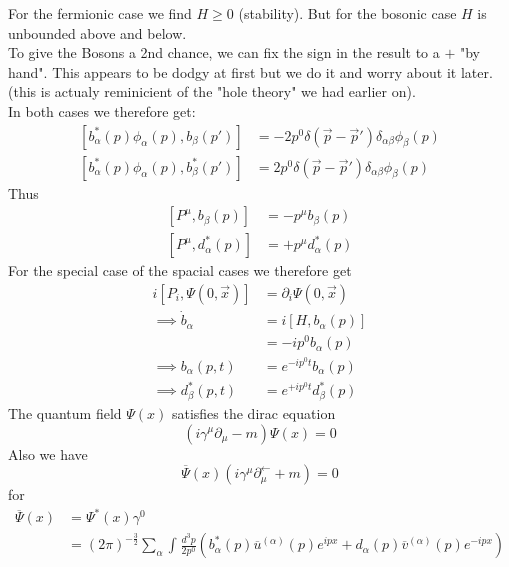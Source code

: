 \documentclass{report}
\begin{document}
For the fermionic case we find $H \ge 0$ (stability). But for the bosonic case $H$ is unbounded above and below.\\
To give the Bosons a 2nd chance, we can fix the sign in the result to a $+$ "by hand". This appears to be dodgy at first but we do it and worry about it later. (this is actualy reminicient of the "hole theory" we had earlier on).\\
In both cases we therefore get:
\begin{align*}
  \left[ b_\alpha ^{*} \left( p \right) \phi_\alpha \left( p \right) , b_\beta \left( p' \right)  \right] &= -2 p^{0} \delta\left( \vec{p} - \vec{p}' \right) \delta_{\alpha \beta} \phi_\beta \left( p \right)  \\
  \left[ b_\alpha ^{*} \left( p \right) \phi_\alpha \left( p \right) , b_\beta ^{*} \left( p' \right)  \right] &= 2 p^{0} \delta\left( \vec{p} - \vec{p}' \right) \delta_{\alpha \beta} \phi_\beta \left( p \right) 
\end{align*}
Thus
\begin{align*}
  \left[ P^{\mu} , b_\beta \left( p \right)  \right] &= - p^{\mu} b_\beta \left( p \right)  \\
  \left[ P^{\mu} , d_\alpha ^{*} \left( p \right)  \right] &= + p^{\mu} d_\alpha ^{*} \left( p \right) 
\end{align*}
For the special case  of the spacial cases we therefore get 
\begin{align*}
  i \left[ P_i, \Psi\left( 0, \vec{x} \right)  \right] &= \partial_i \Psi\left( 0, \vec{x} \right)    \\
  \implies \dot{b}_\alpha &= i \left[ H, b_\alpha \left( p \right)  \right]  \\
  &= -i p^{0} b_\alpha \left( p \right)  \\
  \implies b_\alpha\left( p,t \right) &=  e^{-i p^{0} t} b_\alpha \left( p \right)  \\
  \implies d_\beta ^{*} \left( p, t \right) &=  e^{+ip^{0} t} d_\beta ^{*} \left( p \right) 
\end{align*}
The quantum field $\Psi\left( x \right) $ satisfies the dirac equation \[
\left( i \gamma^{\mu} \partial_\mu - m  \right) \Psi\left( x \right) = 0
\] 
Also we have \[
\overline{\Psi}\left( x \right) \left( i \gamma^{\mu} \partial_\mu^{\leftarrow} + m \right) = 0
\] 
for 
\begin{align*}
  \overline{\Psi}\left( x \right) &= \Psi^{*} \left( x \right) \gamma^{0}  \\
  &= \left( 2\pi \right) ^{-\frac{3}{2} } \sum_{\alpha}^{} \int_{}^{} \frac{d^3p}{2p^{0} } \left( b_\alpha ^{*} \left( p \right) \overline{u}^{\left( \alpha \right) } \left( p \right) e^{ipx} + d_\alpha \left( p \right) \overline{v}^{\left( \alpha \right) } \left( p \right) e^{-ipx}  \right)  
\end{align*}
\end{document}
